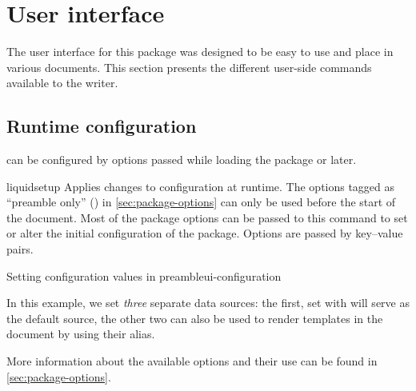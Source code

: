 \section{User interface}
\label{sec:user-interface}

The user interface for this package was designed to be easy to use and
place in various documents. %
This section presents the different user-side commands available to the
writer. %

\subsection{Runtime configuration}
\label{ssec:runtime-configuration}

\lqt{} can be configured by options passed while loading the package or
later. %

\begin{docCommand}[doc new=2025-11-19]{liquidsetup}{}
  Applies changes to  configuration at runtime. %
  The options tagged as \enquote{preamble only} (\preambleonly) in
  \cref{sec:package-options} can only be used before the start of the
  document. %
  Most of the package options can be passed to this command to set or alter
  the initial configuration of the package. %
  Options are passed by key--value pairs. %
\end{docCommand}

\begin{dbexample}{Setting configuration values in preamble}{ui-configuration}
  \begin{preamblecode}
  \end{preamblecode}

  In this example, we set \emph{three} separate data sources: the first, set with  will serve as the default
  source, the other two can also be used to render templates in the
  document by using their alias. %

  More information about the available options and their use can be found
  in \cref{sec:package-options}. %
\end{dbexample}

